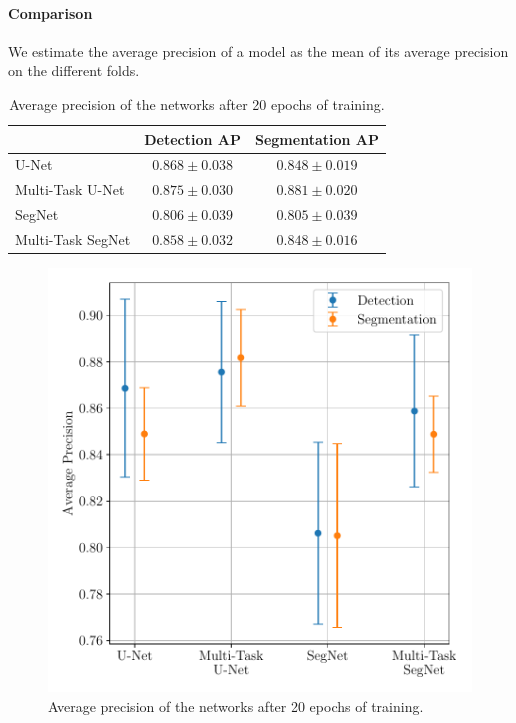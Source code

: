 \documentclass[twocolumn,superscriptaddress,aps,nofootinbib]{revtex4-1}
\begin{document}
\paragraph{Comparison}

We estimate the average precision of a model as the mean of its average precision on the different folds.

\begin{table}[h]
    \begin{tabular}{l|c|c}
                      & Detection AP & Segmentation AP \\ \hline
    U-Net             & $0.868 \pm 0.038$ & $0.848 \pm 0.019$ \\ 
    Multi-Task U-Net  & $0.875 \pm 0.030$ & $0.881 \pm 0.020$ \\
    SegNet            & $0.806 \pm 0.039$ & $0.805 \pm 0.039$ \\
    Multi-Task SegNet & $0.858 \pm 0.032$ & $0.848 \pm 0.016$         
    \end{tabular}
    \caption{Average precision of the networks after 20 epochs of training.}
    \label{tab:average_precision}
\end{table}

\begin{figure}[h]
    \centering
    \vspace{-1em}
    \includegraphics[width=0.75\columnwidth]{resources/pdf/ap.pdf}
    \vspace{-1em}
    \caption{Average precision of the networks after 20 epochs of training.}
    \label{fig:average_precision}
\end{figure}
\end{document}
